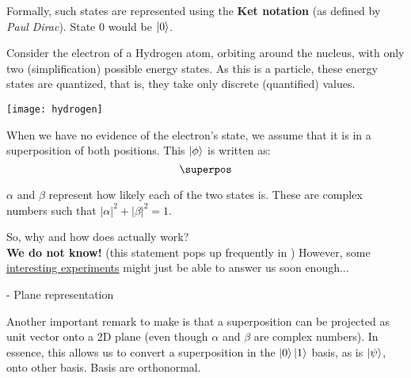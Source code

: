 \documentclass[aspectratio=43]{beamer}
\begin{document}
\begin{frame}{\qsp}
    \begin{cardTiny}
        Formally, such states are represented using the \textbf{Ket notation} (as defined by \textit{Paul Dirac}). State 0 would be $\ket{0}$.
    \end{cardTiny}
    \begin{cardTiny}
        \begin{multicols}{2}
    		Consider the electron of a Hydrogen atom, orbiting around the nucleus, with only two (simplification) possible energy states. As this is a \q particle, these energy states are quantized, that is, they take only discrete (quantified) values. 
    		\begin{center}
    		\texttt{[image: hydrogen]}
    		\end{center}
	    \end{multicols}
    \end{cardTiny}
\pagenumber
\end{frame}

\begin{frame}{\qsp}
    \begin{card}
        When we have no evidence of the electron's state, we assume that it is in a superposition of both positions. This \qsp $\ket{\phi}$ is written as:
	\begin{equation*}
	    \superpos
	\end{equation*}
    \end{card}
    \begin{cardTiny}
        $\alpha$ and $\beta$ represent how likely each of the two states is. These are complex numbers such that $|\alpha|^2 + |\beta|^2 = 1$. 
    \end{cardTiny}
    \begin{cardTiny}
        \small{
        So, why and how does \qsp actually work?\\ \textbf{We do not know!} (this statement pops up frequently in \q) However, some \href{https://arxiv.org/abs/1707.09483}{interesting experiments} might just be able to answer us soon enough...
        }
    \end{cardTiny}
\pagenumber
\end{frame}

\begin{frame}{\qsp\space-  Plane representation}
    \begin{cardTiny}
        \begin{multicols}{2}
    		Another important remark to make is that a superposition can be projected as unit vector onto a 2D plane (even though $\alpha$ and $\beta$ are complex numbers). In essence, this allows us to convert a superposition in the $\ket{0}\ket{1}$ basis, as is $\ket{\psi}$, onto other basis. Basis are orthonormal.
    		\begin{center}
                
    		\end{center}
	    \end{multicols}
    \end{cardTiny}
\pagenumber
\end{frame}
\end{document}
